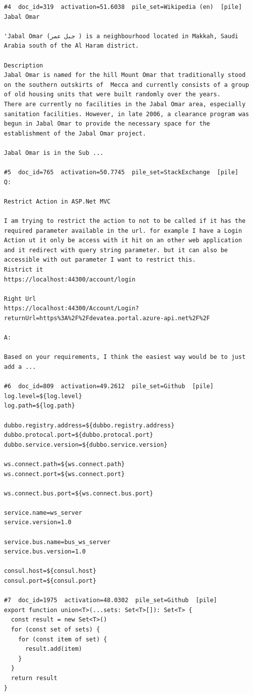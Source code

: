 \begin{verbatim}
#4  doc_id=319  activation=51.6038  pile_set=Wikipedia (en)  [pile]
Jabal Omar

'Jabal Omar (جبل عمر ) is a neighbourhood located in Makkah, Saudi Arabia south of the Al Haram district.

Description 
Jabal Omar is named for the hill Mount Omar that traditionally stood on the southern outskirts of  Mecca and currently consists of a group of old housing units that were built randomly over the years. 
There are currently no facilities in the Jabal Omar area, especially sanitation facilities. However, in late 2006, a clearance program was begun in Jabal Omar to provide the necessary space for the establishment of the Jabal Omar project. 

Jabal Omar is in the Sub ...

#5  doc_id=765  activation=50.7745  pile_set=StackExchange  [pile]
Q:

Restrict Action in ASP.Net MVC

I am trying to restrict the action to not to be called if it has the required parameter available in the url. for example I have a Login Action ut it only be access with it hit on an other web application and it redirect with query string parameter. but it can also be accessible with out parameter I want to restrict this.   
Ristrict it
https://localhost:44300/account/login

Right Url
https://localhost:44300/Account/Login?returnUrl=https%3A%2F%2Fdevatea.portal.azure-api.net%2F%2F

A:

Based on your requirements, I think the easiest way would be to just add a ...

#6  doc_id=809  activation=49.2612  pile_set=Github  [pile]
log.level=${log.level}
log.path=${log.path}

dubbo.registry.address=${dubbo.registry.address}
dubbo.protocal.port=${dubbo.protocal.port}
dubbo.service.version=${dubbo.service.version}

ws.connect.path=${ws.connect.path}
ws.connect.port=${ws.connect.port}

ws.connect.bus.port=${ws.connect.bus.port}

service.name=ws_server
service.version=1.0

service.bus.name=bus_ws_server
service.bus.version=1.0

consul.host=${consul.host}
consul.port=${consul.port}

#7  doc_id=1975  activation=48.0302  pile_set=Github  [pile]
export function union<T>(...sets: Set<T>[]): Set<T> {
  const result = new Set<T>()
  for (const set of sets) {
    for (const item of set) {
      result.add(item)
    }
  }
  return result
}


\end{verbatim}
